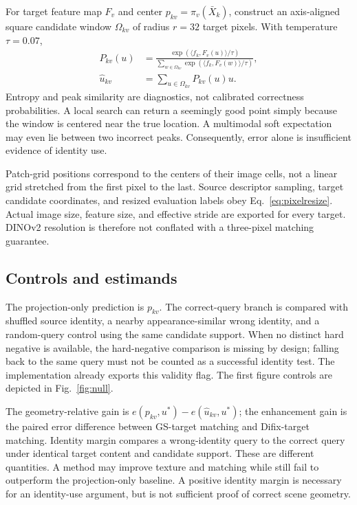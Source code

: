 \documentclass[10pt,twocolumn,letterpaper]{article}
\begin{document}
For target feature map $F_v$ and center $p_{kv}=\pi_v(\bar X_k)$, construct an axis-aligned square candidate window $\Omega_{kv}$ of radius $r=32$ target pixels. With temperature $\tau=0.07$,
\begin{align}
P_{kv}(u)&=\frac{\exp(\langle f_k,F_v(u)\rangle/\tau)}{\sum_{w\in\Omega_{kv}}\exp(\langle f_k,F_v(w)\rangle/\tau)},\\
\widehat u_{kv}&=\sum_{u\in\Omega_{kv}}P_{kv}(u)u.
\label{eq:match}
\end{align}
Entropy and peak similarity are diagnostics, not calibrated correctness probabilities. A local search can return a seemingly good point simply because the window is centered near the true location. A multimodal soft expectation may even lie between two incorrect peaks. Consequently, error alone is insufficient evidence of identity use.

Patch-grid positions correspond to the centers of their image cells, not a linear grid stretched from the first pixel to the last. Source descriptor sampling, target candidate coordinates, and resized evaluation labels obey Eq.~\eqref{eq:pixelresize}. Actual image size, feature size, and effective stride are exported for every target. DINOv2 resolution is therefore not conflated with a three-pixel matching guarantee.

\subsection{Controls and estimands}
The projection-only prediction is $p_{kv}$. The correct-query branch is compared with shuffled source identity, a nearby appearance-similar wrong identity, and a random-query control using the same candidate support. When no distinct hard negative is available, the hard-negative comparison is missing by design; falling back to the same query must not be counted as a successful identity test. The implementation already exports this validity flag. The first figure controls are depicted in Fig.~\ref{fig:null}.

The geometry-relative gain is $e(p_{kv},u^*)-e(\widehat u_{kv},u^*)$; the enhancement gain is the paired error difference between GS-target matching and Difix-target matching. Identity margin compares a wrong-identity query to the correct query under identical target content and candidate support. These are different quantities. A method may improve texture and matching while still fail to outperform the projection-only baseline. A positive identity margin is necessary for an identity-use argument, but is not sufficient proof of correct scene geometry.
\end{document}
